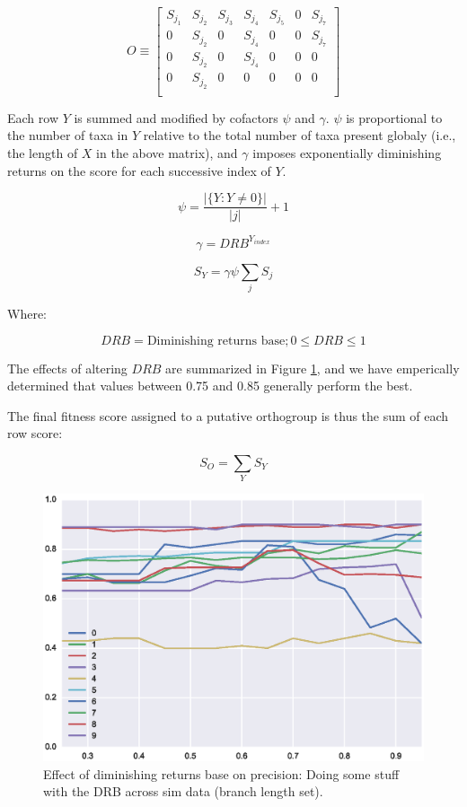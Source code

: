 \documentclass[twocolumn]{bmcart}%
\begin{document}
$$
O \equiv
\begin{bmatrix}
    S_{j_1} & S_{j_2} & S_{j_3} & S_{j_4} & S_{j_5} & 0 & S_{j_7}\\
    0 & S_{j_2} & 0 & S_{j_4} & 0 & 0 & S_{j_7} \\
    0 & S_{j_2} & 0 & S_{j_4} & 0 & 0 & 0 \\
    0 & S_{j_2} & 0 & 0 & 0 & 0 & 0 \\
\end{bmatrix}
$$

Each row $Y$ is summed and modified by cofactors $\psi$ and $\gamma$. $\psi$ is proportional to the number of taxa in $Y$ relative to the total number of taxa present globaly (i.e., the length of $X$ in the above matrix), and $\gamma$ imposes exponentially diminishing returns on the score for each successive index of $Y$.

$$
\psi = \frac{|\{Y:Y \neq 0\}|}{|j|} + 1
$$

$$
\gamma = DRB^{Y_{index}}
$$

$$
S_Y = \gamma\psi\sum_{j} S_j
$$

Where:

$$
DRB = \text{Diminishing returns base}; 0 \leq DRB \leq 1
$$

The effects of altering $DRB$ are summarized in Figure \ref{fig:dim_rets}, and we have emperically determined that values between 0.75 and 0.85 generally perform the best.

The final fitness score assigned to a putative orthogroup is thus the sum of each row score:

$$
S_O = \sum_{Y} S_Y
$$

\begin{figure}[t]
  \begin{center}
  \includegraphics[height=0.22\textheight]{../figures/dim_ret_precision_line.eps}
\end{center}
\caption{Effect of diminishing returns base on precision: Doing some stuff with the DRB across sim data (branch length set).}
\label{fig:dim_rets}
\end{figure}
\end{document}
